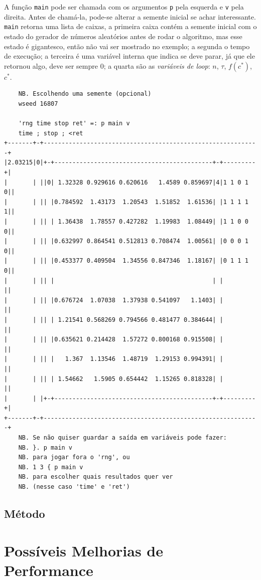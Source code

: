 \documentclass{article}
\newcommand{\inlcode}{\texttt}
\begin{document}
A função \inlcode{main} pode ser chamada com os argumentos
\inlcode{p} pela esquerda e \inlcode{v} pela direita.
Antes de chamá-la, pode-se alterar a semente inicial
se achar interessante.
\inlcode{main} retorna uma lista de caixas,
a primeira caixa contém a semente inicial
com o estado do gerador de números aleatórios
antes de rodar o algoritmo,
mas esse estado é gigantesco,
então não vai ser mostrado no exemplo;
a segunda o tempo de execução;
a terceira é uma variável interna que indica se deve parar,
já que ele retornou algo, deve ser sempre \(0\);
a quarta são as \emph{variáveis de loop}:
\(n\), \(\tau\), \(f(c^*)\), \(c^*\).
\begin{verbatim}
    NB. Escolhendo uma semente (opcional)
    wseed 16807

    'rng time stop ret' =: p main v
    time ; stop ; <ret
+-------+-+------------------------------------------------------------+
|2.03215|0|+-+--------------------------------------------+-+---------+|
|       | ||0| 1.32328 0.929616 0.620616   1.4589 0.859697|4|1 1 0 1 0||
|       | || |0.784592  1.43173  1.20543  1.51852  1.61536| |1 1 1 1 1||
|       | || | 1.36438  1.78557 0.427282  1.19983  1.08449| |1 1 0 0 0||
|       | || |0.632997 0.864541 0.512813 0.708474  1.00561| |0 0 0 1 0||
|       | || |0.453377 0.409504  1.34556 0.847346  1.18167| |0 1 1 1 0||
|       | || |                                            | |         ||
|       | || |0.676724  1.07038  1.37938 0.541097   1.1403| |         ||
|       | || | 1.21541 0.568269 0.794566 0.481477 0.384644| |         ||
|       | || |0.635621 0.214428  1.57272 0.800168 0.915508| |         ||
|       | || |   1.367  1.13546  1.48719  1.29153 0.994391| |         ||
|       | || | 1.54662   1.5905 0.654442  1.15265 0.818328| |         ||
|       | |+-+--------------------------------------------+-+---------+|
+-------+-+------------------------------------------------------------+
    NB. Se não quiser guardar a saída em variáveis pode fazer:
    NB. }. p main v
    NB. para jogar fora o 'rng', ou
    NB. 1 3 { p main v
    NB. para escolher quais resultados quer ver
    NB. (nesse caso 'time' e 'ret')
\end{verbatim}

\subsection{Método}

\section{Possíveis Melhorias de Performance}
\end{document}
